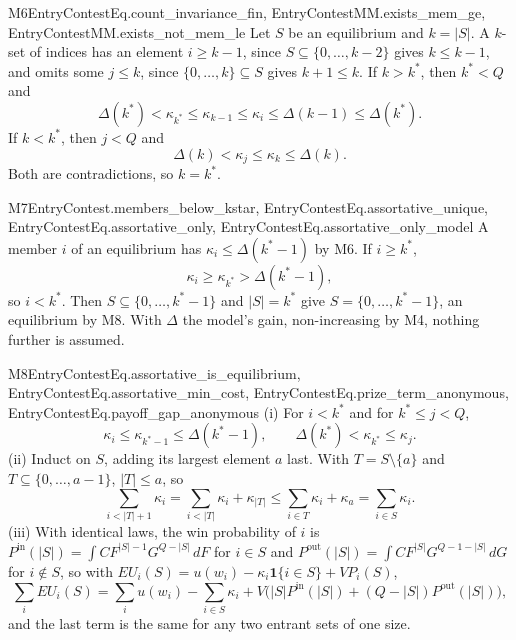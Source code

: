 \begin{mproof}{M6}{EntryContestEq.count_invariance_fin, EntryContestMM.exists_mem_ge, EntryContestMM.exists_not_mem_le}
Let $S$ be an equilibrium and $k=|S|$. A $k$-set of indices has an element
$i\ge k-1$, since
$S\subseteq\{0,\dots,k-2\}$ gives $k\le k-1$, and omits some $j\le k$, since
$\{0,\dots,k\}\subseteq S$ gives $k+1\le k$. If $k>k^*$, then $k^*<Q$ and
\[
  \Delta(k^*)<\kappa_{k^*}\le\kappa_{k-1}\le\kappa_i\le\Delta(k-1)\le\Delta(k^*).
\]
If $k<k^*$, then $j<Q$ and
\[
  \Delta(k)<\kappa_j\le\kappa_k\le\Delta(k).
\]
Both are contradictions, so $k=k^*$.
\end{mproof}

\begin{mproof}{M7}{EntryContest.members_below_kstar, EntryContestEq.assortative_unique, EntryContestEq.assortative_only, EntryContestEq.assortative_only_model}
A member $i$ of an equilibrium has $\kappa_i\le\Delta(k^*-1)$ by M6. If $i\ge k^*$,
\[
  \kappa_i\ge\kappa_{k^*}>\Delta(k^*-1),
\]
so $i<k^*$. Then $S\subseteq\{0,\dots,k^*-1\}$ and $|S|=k^*$ give
$S=\{0,\dots,k^*-1\}$, an equilibrium by M8. With $\Delta$ the model's gain,
non-increasing by M4, nothing further is assumed.
\end{mproof}

\begin{mproof}{M8}{EntryContestEq.assortative_is_equilibrium, EntryContestEq.assortative_min_cost, EntryContestEq.prize_term_anonymous, EntryContestEq.payoff_gap_anonymous}
(i) For $i<k^*$ and for $k^*\le j<Q$,
\[
  \kappa_i\le\kappa_{k^*-1}\le\Delta(k^*-1),\qquad \Delta(k^*)<\kappa_{k^*}\le\kappa_j .
\]
(ii) Induct on $S$, adding its largest element $a$ last. With $T=S\setminus\{a\}$
and $T\subseteq\{0,\dots,a-1\}$, $|T|\le a$, so
\[
  \sum_{i<|T|+1}\kappa_i=\sum_{i<|T|}\kappa_i+\kappa_{|T|}
  \le\sum_{i\in T}\kappa_i+\kappa_a=\sum_{i\in S}\kappa_i .
\]
(iii) With identical laws, the win probability of $i$ is
$P^{\mathrm{in}}(|S|)=\int CF^{|S|-1}G^{Q-|S|}\,dF$ for $i\in S$ and
$P^{\mathrm{out}}(|S|)=\int CF^{|S|}G^{Q-1-|S|}\,dG$ for $i\notin S$, so with
$EU_i(S)=u(w_i)-\kappa_i\mathbf 1\{i\in S\}+V P_i(S)$,
\[
  \sum_iEU_i(S)=\sum_iu(w_i)-\sum_{i\in S}\kappa_i
  +V\big(|S|P^{\mathrm{in}}(|S|)+(Q-|S|)P^{\mathrm{out}}(|S|)\big),
\]
and the last term is the same for any two entrant sets of one size.
\end{mproof}

